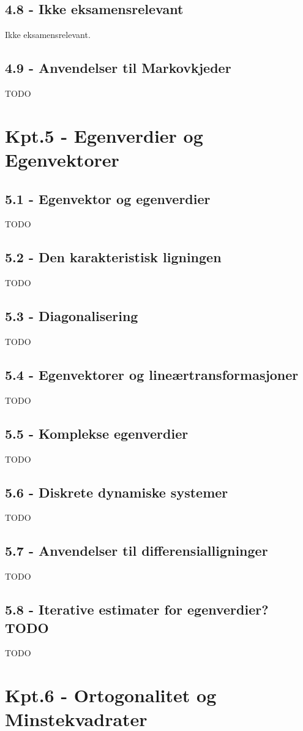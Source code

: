 \documentclass{article}
\begin{document}
    \subsection{4.8 - Ikke eksamensrelevant}
      Ikke eksamensrelevant.
    \subsection{4.9 - Anvendelser til Markovkjeder}
      TODO
  \section{Kpt.5 - Egenverdier og Egenvektorer}
    \subsection{5.1 - Egenvektor og egenverdier}
      TODO
    \subsection{5.2 - Den karakteristisk ligningen}
      TODO
    \subsection{5.3 - Diagonalisering}
      TODO
    \subsection{5.4 - Egenvektorer og lineærtransformasjoner}
      TODO
    \subsection{5.5 - Komplekse egenverdier}
      TODO
    \subsection{5.6 - Diskrete dynamiske systemer}
      TODO
    \subsection{5.7 - Anvendelser til differensialligninger}
      TODO
    \subsection{5.8 - Iterative estimater for egenverdier? TODO}
      TODO
  \section{Kpt.6 - Ortogonalitet og Minstekvadrater}
\end{document}

